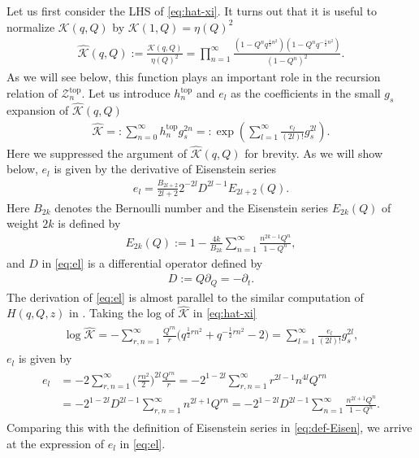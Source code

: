 \documentclass[11pt]{article}
\newcommand{\hf}{\frac{1}{2}}
\def\del{\partial}
\def\h#1{\widehat{#1}}
\newcommand{\Ztop}{\mathcal{Z}^{\text{top}}}
\renewcommand{\[}{\begin{eqnarray}}
\renewcommand{\]}{\end{eqnarray}}
\begin{document}
Let us first consider the LHS of \eqref{eq:hat-xi}. 
It turns out that it is useful
to normalize $\mathcal{K}(q,Q)$ by
$\mathcal{K}(1,Q)=\eta(Q)^2$ 
\begin{equation}
\begin{aligned}
 \h{\mathcal{K}}(q,Q):=
\frac{\mathcal{K}(q,Q)}{\eta(Q)^2}=\prod_{n=1}^\infty
\frac{(1-Q^nq^{\hf n^2})(1-Q^nq^{-\hf n^2})}{(1-Q^n)^2}.
\end{aligned} 
\label{eq:hxi-def}
\end{equation}
As we will see below, this function
plays an important role in the recursion relation 
of $\Ztop_n$. 
Let us introduce $h_n^{\text{top}}$ and 
$e_l$ as the coefficients 
in the small $g_s$ expansion of $\h{\mathcal{K}}(q,Q)$
\begin{align}
 \h{\mathcal{K}}=:\sum_{n=0}^\infty h_n^{\text{top}}g_s^{2n}
=:\exp\left(\sum_{l=1}^\infty \frac{e_l}{(2l)!}g_s^{2l}\right).
\label{eq:hxi-exp}
\end{align}
Here we suppressed the argument of $\h{\mathcal{K}}(q,Q)$
for brevity.
As we will show below, 
$e_l$ is given by the derivative of Eisenstein series
\begin{align}
 e_l=\frac{B_{2l+2}}{2l+2}2^{-2l}D^{2l-1}E_{2l+2}(Q).
\label{eq:el}
\end{align}
Here $B_{2k}$ denotes the Bernoulli number
and the Eisenstein series $E_{2k}(Q)$
of weight $2k$ is defined by
\begin{align}
 E_{2k}(Q):=1-\frac{4k}{B_{2k}}\sum_{n=1}^\infty  \frac{n^{2k-1}Q^n}{1-Q^n},
\label{eq:def-Eisen}
\end{align}
and $D$ in \eqref{eq:el} is a differential operator defined by
\begin{align}
 D:=Q\del_Q=-\del_t.
\end{align}
The derivation of \eqref{eq:el}
is almost parallel to the similar computation of $H(q,Q,z)$ in \cite{zagier}.
Taking the log of $\h{\mathcal{K}}$ in \eqref{eq:hat-xi}
\begin{align}
 \begin{aligned}
  \log\h{\mathcal{K}}=-\sum_{r,n=1}^\infty
\frac{Q^{rn}}{r}\bigl(q^{\hf rn^2}+q^{-\hf rn^2}-2\bigr)=
\sum_{l=1}^\infty \frac{e_l}{(2l)!}g_s^{2l},
 \end{aligned}
\end{align}
$e_l$ is given by
\begin{align}
 \begin{aligned}
  e_l&=-2\sum_{r,n=1}^\infty\biggl(\frac{rn^2}{2}\biggr)^{2l}\frac{Q^{rn}}{r}=-2^{1-2l} \sum_{r,n=1}^\infty r^{2l-1}n^{4l}Q^{rn}\\
&=-2^{1-2l}D^{2l-1}\sum_{r,n=1}^\infty n^{2l+1}Q^{rn}=-2^{1-2l}D^{2l-1}\sum_{n=1}^\infty\frac{n^{2l+1}Q^n}{1-Q^n}.
 \end{aligned}
\end{align} 
Comparing this with the definition of Eisenstein series in \eqref{eq:def-Eisen},
we arrive at the expression of $e_l$  in \eqref{eq:el}.
\end{document}
